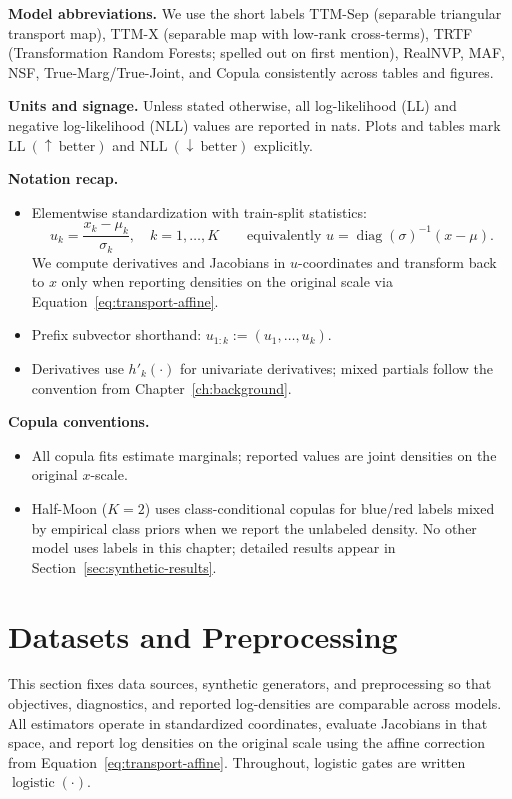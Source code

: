 \documentclass[11pt,a4paper,twoside]{book}\usepackage[]{graphicx}\usepackage[]{xcolor}
\begin{document}
\textbf{Model abbreviations.} We use the short labels TTM-Sep (separable triangular transport map), TTM-X (separable map with low-rank cross-terms), TRTF (Transformation Random Forests; spelled out on first mention), RealNVP, MAF, NSF, True-Marg/True-Joint, and Copula consistently across tables and figures.

\textbf{Units and signage.} Unless stated otherwise, all log-likelihood (LL) and negative log-likelihood (NLL) values are reported in nats. Plots and tables mark $\text{LL}~(\uparrow~\text{better})$ and $\text{NLL}~(\downarrow~\text{better})$ explicitly.

\textbf{Notation recap.}
\begin{itemize}
  \item Elementwise standardization with train-split statistics:
  \[ 
    u_k = \frac{x_k - \mu_k}{\sigma_k},\quad k = 1,\ldots,K
    \qquad\text{equivalently } u = \operatorname{diag}(\sigma)^{-1}(x - \mu).
  \]
  We compute derivatives and Jacobians in $u$-coordinates and transform back to $x$ only when reporting densities on the original scale via Equation~\eqref{eq:transport-affine}.
  \item Prefix subvector shorthand: $u_{1:k} := (u_1,\ldots,u_k)$.
  \item Derivatives use $h'_k(\cdot)$ for univariate derivatives; mixed partials follow the convention from Chapter~\ref{ch:background}.
\end{itemize}

\textbf{Copula conventions.}
\begin{itemize}
  \item All copula fits estimate marginals; reported values are joint densities on the original $x$-scale.
  \item Half-Moon ($K=2$) uses class-conditional copulas for blue/red labels mixed by empirical class priors when we report the unlabeled density. No other model uses labels in this chapter; detailed results appear in Section~\ref{sec:synthetic-results}.
\end{itemize}

\section{Datasets and Preprocessing}\label{sec:datasets-preprocessing}

This section fixes data sources, synthetic generators, and preprocessing so that objectives, diagnostics, and reported log-densities are comparable across models. All estimators operate in standardized coordinates, evaluate Jacobians in that space, and report log densities on the original scale using the affine correction from Equation~\eqref{eq:transport-affine}. Throughout, logistic gates are written $\operatorname{logistic}(\cdot)$.
\end{document}
